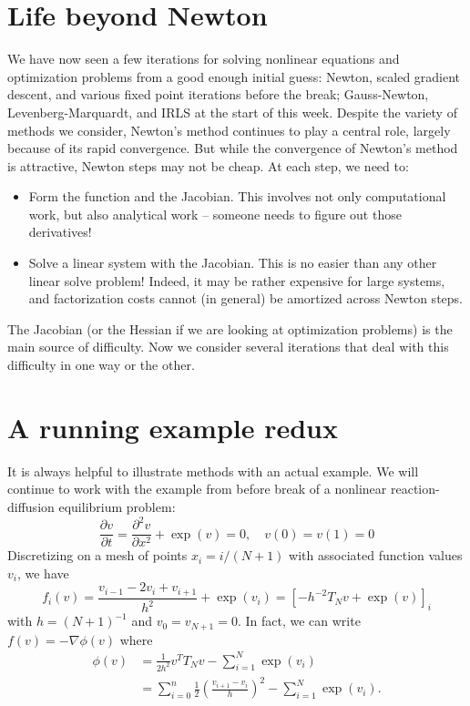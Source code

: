 \documentclass[12pt, leqno]{article} %
\providecommand{\tightlist}{%
  \setlength{\itemsep}{0pt}\setlength{\parskip}{0pt}}
\begin{document}

\section{Life beyond Newton}

We have now seen a few iterations for solving nonlinear equations and
optimization problems from a good enough initial guess: Newton, scaled
gradient descent, and various fixed point iterations before the break;
Gauss-Newton, Levenberg-Marquardt, and IRLS at the start of this week.
Despite the variety of methods we consider, Newton's method continues to
play a central role, largely because of its rapid convergence. But while
the convergence of Newton's method is attractive, Newton steps may not
be cheap. At each step, we need to:

\begin{itemize}
\tightlist
\item
  Form the function and the Jacobian. This involves not only
  computational work, but also analytical work -- someone needs to
  figure out those derivatives!
\item
  Solve a linear system with the Jacobian. This is no easier than any
  other linear solve problem! Indeed, it may be rather expensive for
  large systems, and factorization costs cannot (in general) be
  amortized across Newton steps.
\end{itemize}

The Jacobian (or the Hessian if we are looking at optimization problems)
is the main source of difficulty. Now we consider several iterations
that deal with this difficulty in one way or the other.

\section{A running example redux}

It is always helpful to illustrate methods with an actual example. We
will continue to work with the example from before break of a nonlinear
reaction-diffusion equilibrium problem:
\[\frac{\partial v}{\partial t} = 
  \frac{\partial^2 v}{\partial x^2} + \exp(v) = 0, \quad v(0) = v(1) = 0\]
Discretizing on a mesh of points \(x_i = i/(N+1)\) with associated
function values \(v_i\), we have \[f_i(v) 
  = \frac{v_{i-1}-2v_i+v_{i+1}}{h^2} + \exp(v_i) 
  = \left[ -h^{-2} T_N v + \exp(v) \right]_i\] with \(h = (N+1)^{-1}\)
and \(v_0 = v_{N+1} = 0\). In fact, we can write
\(f(v) = -\nabla \phi(v)\) where \begin{align*}
  \phi(v) &= \frac{1}{2h^2} v^T T_N v - \sum_{i=1}^{N} \exp(v_i) \\
          &= \sum_{i=0}^n \frac{1}{2} \left( \frac{v_{i+1}-v_i}{h} \right)^2 - \sum_{i=1}^{N} \exp(v_i).
\end{align*}
\end{document}
